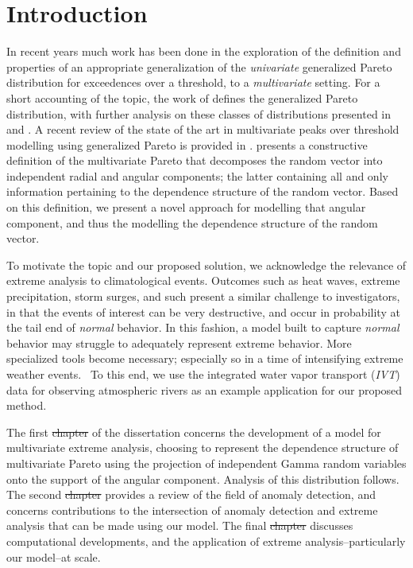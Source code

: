

\section{Introduction}
In recent years much work has been done in the exploration of the definition and properties of an
  appropriate generalization of the \emph{univariate} generalized Pareto distribution for exceedences
  over a threshold, to a \emph{multivariate} setting.  For a short accounting of the topic, the work of
  \cite{rootzen2006} defines the generalized Pareto distribution, with further analysis on these classes
  of distributions presented in \cite{falk2008} and \cite{michel2008}.  A recent review of the state
  of the art in multivariate peaks over threshold modelling using generalized Pareto is provided in
  \cite{rootzen2018}.  \cite{ferreira2014} presents a constructive definition of the multivariate Pareto
  that decomposes the random vector into independent radial and angular components; the latter
  containing all and only information pertaining to the dependence structure of the random vector.
  Based on this definition, we present a novel approach for modelling that angular component, and thus
  the modelling the dependence structure of the random vector.

To motivate the topic and our proposed solution, we acknowledge the relevance of extreme analysis to
  climatological events.  Outcomes such as heat waves, extreme precipitation, storm surges, and
  such present a similar challenge to investigators, in that the events of interest can be very destructive,
  and occur in probability at the tail end of \emph{normal} behavior.  In this fashion, a model built
  to capture \emph{normal} behavior may struggle to adequately represent extreme behavior.  More
  specialized tools become necessary; especially so in a time of intensifying extreme weather
  events.~\citep{jentsch2007,vousdoukas2018,li2019}  To this end, we use the integrated water vapor
  transport (\emph{IVT}) data for observing atmospheric rivers as an example application for our proposed method.

The first \st{chapter} of the dissertation concerns the development of a model for multivariate extreme analysis,
  choosing to represent the dependence structure of multivariate Pareto using the projection of independent
  Gamma random variables onto the support of the angular component.  Analysis of this distribution follows.
  The second \st{chapter}  provides a review of the field of anomaly detection, and concerns contributions
  to the intersection of anomaly detection and extreme analysis that can be made using our model.
  The final \st{chapter}  discusses computational developments, and the application of extreme
  analysis--particularly our model--at scale.

